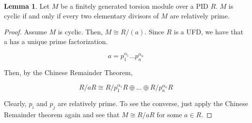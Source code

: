\documentclass{article}
\theoremstyle{definition}
\newtheorem{lemma}[theorem]{Lemma}
\begin{document}
\begin{lemma}
    Let $M$ be a finitely generated torsion module over a PID $R$. $M$ is cyclic if and only if every two elementary divisors of $M$ are relatively prime.
\end{lemma}
\begin{proof}
    Assume $M$ is cyclic. Then, $M \cong R/(a)$. Since $R$ is a UFD, we have that a has a unique prime factorization. 

    \[ a = p_{1}^{\alpha_{1}}...p_{n}^{\alpha_{n}}\]

    Then, by the Chinese Remainder Theorem,

    \[ R/aR \cong R/p_{1}^{\alpha_{1}}R \oplus ... \oplus R/p_{n}^{\alpha_{n}}R \]

    Clearly, $p_{i}$ and $p_{j}$ are relatively prime. To see the converse, just apply the Chinese Remainder theorem again and see that $M \cong R/aR$ for some $a \in R$. 
    
\end{proof}
    
\end{document}
